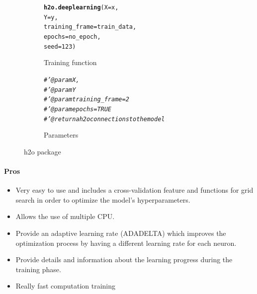 \documentclass[letter,8pt]{article}\usepackage[]{graphicx}\usepackage[]{color}
\makeatletter
\newcommand{\hlnum}[1]{\textcolor[rgb]{0.686,0.059,0.569}{#1}}%
\newcommand{\hlcom}[1]{\textcolor[rgb]{0.678,0.584,0.686}{\textit{#1}}}%
\newcommand{\hlstd}[1]{\textcolor[rgb]{0.345,0.345,0.345}{#1}}%
\newcommand{\hlkwc}[1]{\textcolor[rgb]{0.333,0.667,0.333}{#1}}%
\newcommand{\hlkwd}[1]{\textcolor[rgb]{0.737,0.353,0.396}{\textbf{#1}}}%
\newenvironment{kframe}{%
 \def\at@end@of@kframe{}%
 \ifinner\ifhmode%
  \def\at@end@of@kframe{\end{minipage}}%
  \begin{minipage}{\columnwidth}%
 \fi\fi%
 \def\FrameCommand##1{\hskip\@totalleftmargin \hskip-\fboxsep
 \colorbox{shadecolor}{##1}\hskip-\fboxsep
     \hskip-\linewidth \hskip-\@totalleftmargin \hskip\columnwidth}%
 \MakeFramed {\advance\hsize-\width
   \@totalleftmargin\z@ \linewidth\hsize
   \@setminipage}}%
 {\par\unskip\endMakeFramed%
 \at@end@of@kframe}
\newenvironment{knitrout}{}{} %
\makeatother
\begin{document}
\begin{figure}[H]
  \begin{subfigure}{0.5\textwidth}
\begin{knitrout}
\color{fgcolor}\begin{kframe}
\begin{alltt}
\hlkwd{h2o.deeplearning}\hlstd{(}\hlkwc{X} \hlstd{= x,}
                  \hlkwc{Y} \hlstd{= y,}
                  \hlkwc{training_frame} \hlstd{= train_data,}
                  \hlkwc{epochs} \hlstd{= no_epoch,}
                  \hlkwc{seed}\hlstd{=}\hlnum{123}\hlstd{)}
\end{alltt}
\end{kframe}
\end{knitrout}
    \caption{Training function}
  \end{subfigure}
  \begin{subfigure}{0.5\textwidth}
    \centering
\begin{knitrout}
\color{fgcolor}\begin{kframe}
\begin{alltt}
\hlcom{#' @param X,}
\hlcom{#' @param Y}
\hlcom{#' @param training_frame=2}
\hlcom{#' @param epochs=TRUE}
\hlcom{#' @return a h2o connections to the model}
\end{alltt}
\end{kframe}
\end{knitrout}
    \caption{Parameters}
  \end{subfigure}
    \caption{h2o package}
\end{figure}

\paragraph{Pros}
\begin{itemize}
\item Very easy to use and includes a cross-validation feature and functions for grid search in order to optimize the model's hyperparameters.
\item Allows the use of multiple CPU.
\item Provide an adaptive learning rate (ADADELTA) which improves the optimization process by having a different learning rate for each neuron.
\item Provide details and information about the learning progress during the training phase.
\item Really fast computation training
\end{itemize}
\end{document}
